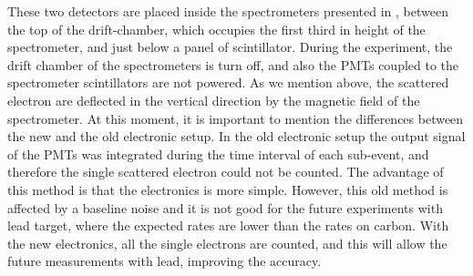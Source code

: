 \begin{figure}[hbtp]
\centering
{}
\end{figure}

These two detectors are placed inside the spectrometers presented in , between the top of the drift-chamber, which occupies the first third in height of the spectrometer, and just below a panel of scintillator. During the experiment, the drift chamber of the spectrometers is turn off, and also the PMTs coupled to the spectrometer scintillators are not powered.
As we mention above, the scattered electron are deflected in the vertical direction by the magnetic field of the spectrometer. 
At this moment, it is important to mention the differences between the new and the old electronic setup. In the old electronic setup the output signal of the PMTs was integrated during the time interval of each sub-event, and therefore the single scattered electron could not be counted. The advantage of this method is that the electronics is more simple. However, this old method is affected by a baseline noise and it is not good for the future experiments with lead target, where the expected rates are lower than the rates on carbon.
With the new electronics, all the single electrons are counted, and this will allow the future measurements with lead, improving the accuracy. 

